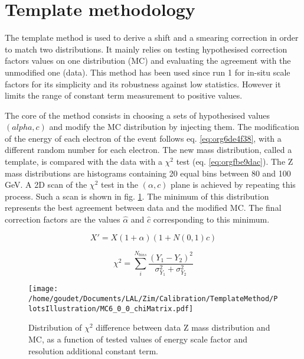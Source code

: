 \section{Template methodology}
\label{sec:orgc421dd0}

The template method is used to derive a shift and a smearing correction in order to match two distributions.
It mainly relies on testing hypothesised correction factors values on one distribution (MC) and evaluating the agreement with the unmodified one (data).
This method has been used since run 1 for in-situ scale factors for its simplicity and its robustness against low statistics.
However it limits the range of constant term measurement to positive values.

The core of the method consists in choosing a sets of hypothesised values $(alpha, c)$ and modify the MC distribution by injecting them.
The modification of the energy of each electron of the event follows eq. \ref{eq:org6de4f38}, with a different random number for each electron.
The new mass distribution, called a template, is compared with the data with a $\chi^2$ test (eq. \ref{eq:orgfbe9dac}).
The Z mass distributions are histograms containing 20 equal bins between 80 and 100 GeV.
A 2D scan of the $\chi^2$ test in the $(\alpha,c)$ plane is achieved by repeating this process.
Such a scan is shown in fig. \ref{fig:orgc320d11}.
The minimum of this distribution represents the best agreement between data and the modified MC.
The final correction factors are the values $\hat{\alpha}$ and $\hat{c}$ corresponding to this minimum.

\begin{equation}
\label{eq:org6de4f38}
  X' = X(1+\alpha)(1+N(0,1)c)
\end{equation}

\begin{equation}
\label{eq:orgfbe9dac}
\chi^2 = \sum \limits_i^{N_{bins}} \frac{(Y_1-Y_2)^2}{\sigma_{Y_1}^2 + \sigma_{Y_2}^2}
\end{equation}

\begin{figure}[htbp]
\centering
\texttt{[image: /home/goudet/Documents/LAL/Zim/Calibration/TemplateMethod/PlotsIllustration/MC6\_0\_0\_chiMatrix.pdf]}
\caption{\label{fig:orgc320d11}
Distribution of $\chi^2$ difference between data Z mass distribution and MC, as a function of tested values of energy scale factor and resolution additional constant term.}
\end{figure}

